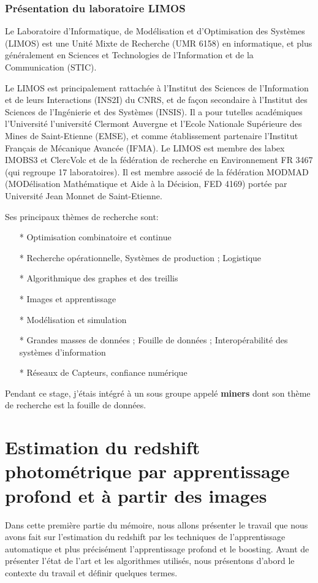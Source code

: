 \documentclass[french]{report}
\begin{document}
%
\section*{Présentation du laboratoire LIMOS} 

Le Laboratoire d'Informatique, de Modélisation et d'Optimisation des Systèmes (LIMOS) est une Unité Mixte de Recherche (UMR 6158) en informatique, et plus généralement en Sciences et Technologies de l'Information et de la Communication (STIC).

Le LIMOS est principalement rattachée à l'Institut des Sciences de l'Information et de leurs Interactions (INS2I) du CNRS, et de façon secondaire à l’Institut des Sciences de l'Ingénierie et des Systèmes (INSIS). Il a pour tutelles académiques l’Université l'université Clermont Auvergne et l'Ecole Nationale Supérieure des Mines de Saint-Etienne (EMSE), et comme établissement partenaire l'Institut Français de Mécanique Avancée (IFMA). Le LIMOS est membre des labex IMOBS3 et ClercVolc et de la fédération de recherche en Environnement FR 3467 (qui regroupe 17 laboratoires). Il est membre associé de la fédération MODMAD (MODélisation Mathématique et Aide à la Décision, FED 4169) portée par Université Jean Monnet de Saint-Etienne.

Ses principaux thèmes de recherche sont: 
\begin{itemize}
\item[*] Optimisation combinatoire et continue 
\item[*] Recherche opérationnelle, Systèmes de production ; Logistique 
\item[*] Algorithmique des graphes et des treillis 
\item[*] Images et apprentissage 
\item[*] Modélisation et simulation 
\item[*] Grandes masses de données ; Fouille de données ; Interopérabilité des systèmes d’information
\item[*] Réseaux de Capteurs, confiance numérique
\end{itemize}

Pendant ce stage, j'étais intégré à un sous groupe appelé \textbf{miners} dont son thème de recherche est la fouille de données.



\part{Estimation du redshift photométrique par apprentissage profond et à partir des images}
 Dans cette première partie du mémoire, nous allons présenter le travail que nous avons fait sur l'estimation du redshift par les techniques de l'apprentissage automatique et plus précisément l'apprentissage profond et le boosting. Avant de présenter l'état de l'art et les algorithmes utilisés, nous présentons d'abord le contexte du travail et définir quelques termes. 




\end{document}

